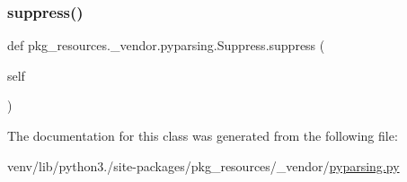 \subsubsection{\texorpdfstring{suppress()}{suppress()}}
{\footnotesize\ttfamily def pkg\+\_\+resources.\+\_\+vendor.\+pyparsing.\+Suppress.\+suppress (\begin{DoxyParamCaption}\item[{}]{self }\end{DoxyParamCaption})}



The documentation for this class was generated from the following file\+:\begin{DoxyCompactItemize}
\item 
venv/lib/python3./site-\/packages/pkg\+\_\+resources/\+\_\+vendor/\hyperlink{pkg__resources_2__vendor_2pyparsing_8py}{pyparsing.\+py}\end{DoxyCompactItemize}
